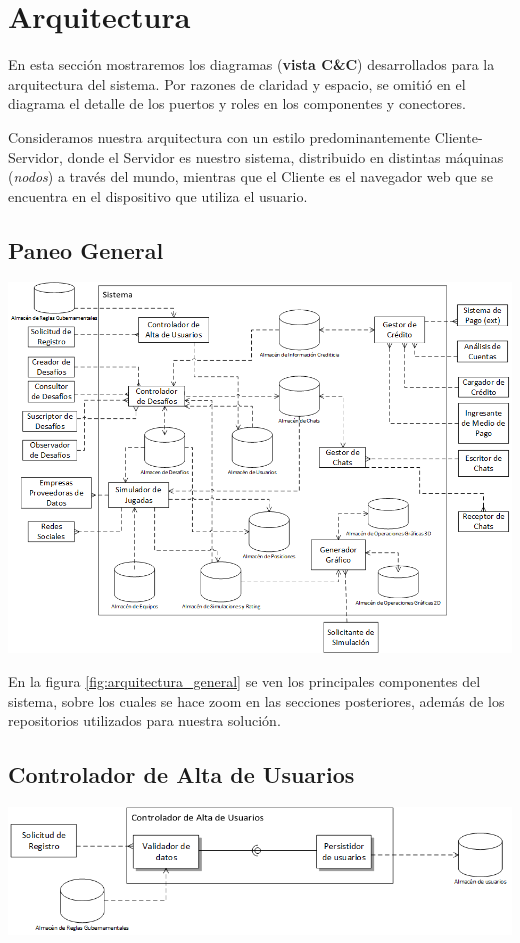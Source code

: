 \section{Arquitectura}
En esta sección mostraremos los diagramas (\textbf{vista C\&C}) desarrollados para la arquitectura del sistema. Por razones de claridad y espacio, se omitió en el diagrama el detalle de los puertos y roles en los componentes y conectores.

Consideramos nuestra arquitectura con un estilo predominantemente Cliente-Servidor, donde el Servidor es nuestro sistema, distribuido en distintas máquinas (\textit{nodos}) a través del mundo, mientras que el Cliente es el navegador web que se encuentra en el dispositivo que utiliza el usuario.

\subsection{Paneo General}
\includegraphics[scale=0.80,angle=90]{diagramas/arquitectura_general}
\label{fig:arquitectura_general}

En la figura \ref{fig:arquitectura_general} se ven los principales componentes del sistema, sobre los cuales se hace zoom en las secciones posteriores, además de los repositorios utilizados para nuestra solución.

\subsection{Controlador de Alta de Usuarios}
\includegraphics[scale=0.65]{diagramas/controlador_de_usuarios}
\label{fig:controlador_de_usuarios}

